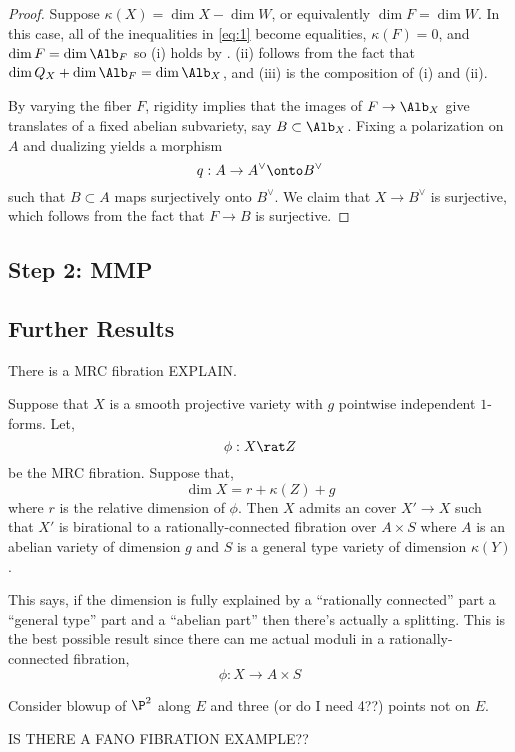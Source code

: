 \documentclass[12pt]{article}
\begin{document}
\begin{proof}
Suppose $\kappa(X) = \dim{X} - \dim{W}$, or equivalently $\dim{F} = \dim{W}$. In this case, all of the inequalities in \eqref{eq:1} become equalities, $\kappa(F) = 0$, and $\dim{F} = \dim{\Alb_F}$ so (i) holds by \cite[Theorem 1]{kawamata_abelian_varieties}. (ii) follows from the fact that $\dim{Q_X} + \dim{\Alb_F} = \dim{\Alb_X}$, and (iii) is the composition of (i) and (ii).

By varying the fiber $F$, rigidity implies that the images of $F \to \Alb_X$ give translates of a fixed abelian subvariety, say $B \subset \Alb_X$. Fixing a polarization on $A$ and dualizing yields a morphism
\[ q : A \to A^\vee \onto B^\vee \]
such that $B \subset A$ maps surjectively onto $B^\vee$. We claim that $X \to B^\vee$ is surjective, which follows from the fact that $F \to B$ is surjective.
\end{proof}


\subsection{Step 2: MMP}

\subsection{Further Results}

There is a MRC fibration EXPLAIN.

\begin{theorem}
Suppose that $X$ is a smooth projective variety with $g$ pointwise independent $1$-forms. Let,
\[ \phi : X \rat Z \]
be the MRC fibration. Suppose that,
\[ \dim{X} = r + \kappa(Z) + g \]
where $r$ is the relative dimension of $\phi$. Then $X$ admits an \etale cover $X' \to X$ such that $X'$ is birational to a rationally-connected fibration over $A \times S$ where $A$ is an abelian variety of dimension $g$ and $S$ is a general type variety of dimension $\kappa(Y)$.
\end{theorem}

This says, if the dimension is fully explained by a ``rationally connected'' part a ``general type'' part and a ``abelian part'' then there's actually a splitting. This is the best possible result since there can me actual moduli in a rationally-connected fibration,
\[ \phi : X \to A \times S \]

\begin{example}
Consider blowup of $\P^2$ along $E$ and three (or do I need 4??) points not on $E$. 

IS THERE A FANO FIBRATION EXAMPLE??
\end{example}
\end{document}
